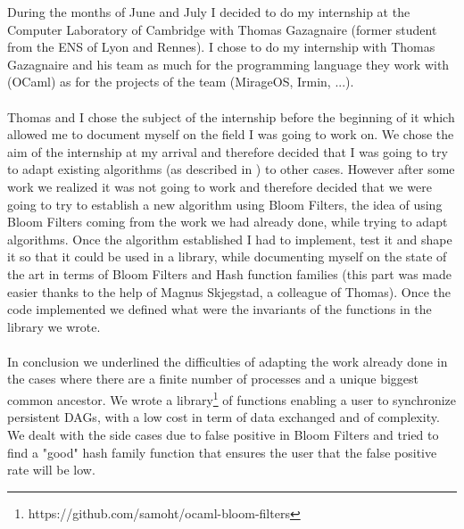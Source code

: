During the months of June and July I decided to do my internship at the Computer Laboratory of Cambridge with Thomas Gazagnaire (former student from the ENS of Lyon and Rennes). I chose to do my internship with Thomas Gazagnaire and his team as much for the programming language they work with (OCaml) as for the projects of the team (MirageOS, Irmin, ...). 
\paragraph{} Thomas and I chose the subject of the internship before the beginning of it which allowed me to document myself on the field I was going to work on. We chose the aim of the internship at my arrival and therefore decided that I was going to try to adapt existing algorithms (as described in \cite{DBLP:journals/cacm/Lamport78}) to other cases. However after some work we realized it was not going to work and therefore decided that we were going to try to establish a new algorithm using Bloom Filters, the idea of using Bloom Filters coming from the work we had already done, while trying to adapt algorithms. Once the algorithm established I had to implement, test it and shape it so that it could be used in a library, while documenting myself on the state of the art in terms of Bloom Filters and Hash function families (this part was made easier thanks to the help of Magnus Skjegstad, a colleague of Thomas). Once the code implemented we defined what were the invariants of the functions in the library we 
wrote.

\paragraph{} In conclusion we underlined the difficulties of adapting the work already done in the cases where there are a finite number of processes and a unique biggest common ancestor. We wrote a library\footnote{https://github.com/samoht/ocaml-bloom-filters} of functions enabling a user to synchronize persistent DAGs, with a low cost in term of data exchanged and of complexity. We dealt with the side cases due to false positive in Bloom Filters and tried to find a "good" hash family function that ensures the user that the false positive rate will be low.